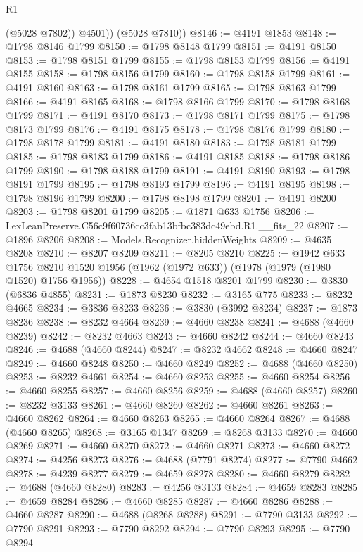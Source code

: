 \begin{lexlean}{R1}
\begin{coremodule}
            (@5028 @7802))
          @4501))
      (@5028 @7810))
@8146 := @4191 @1853
@8148 := @1798 @8146 @1799
@8150 := @1798 @8148 @1799
@8151 := @4191 @8150
@8153 := @1798 @8151 @1799
@8155 := @1798 @8153 @1799
@8156 := @4191 @8155
@8158 := @1798 @8156 @1799
@8160 := @1798 @8158 @1799
@8161 := @4191 @8160
@8163 := @1798 @8161 @1799
@8165 := @1798 @8163 @1799
@8166 := @4191 @8165
@8168 := @1798 @8166 @1799
@8170 := @1798 @8168 @1799
@8171 := @4191 @8170
@8173 := @1798 @8171 @1799
@8175 := @1798 @8173 @1799
@8176 := @4191 @8175
@8178 := @1798 @8176 @1799
@8180 := @1798 @8178 @1799
@8181 := @4191 @8180
@8183 := @1798 @8181 @1799
@8185 := @1798 @8183 @1799
@8186 := @4191 @8185
@8188 := @1798 @8186 @1799
@8190 := @1798 @8188 @1799
@8191 := @4191 @8190
@8193 := @1798 @8191 @1799
@8195 := @1798 @8193 @1799
@8196 := @4191 @8195
@8198 := @1798 @8196 @1799
@8200 := @1798 @8198 @1799
@8201 := @4191 @8200
@8203 := @1798 @8201 @1799
@8205 := @1871 @633 @1756
@8206 := LexLeanPreserve.C56c9f60736cc3fab13bfbc383dc49ebd.R1.__fits_22
@8207 := @1896 @8206
@8208 := Models.Recognizer.hiddenWeights
@8209 := @4635 @8208
@8210 := @8207 @8209
@8211 := @8205 @8210
@8225 := @1942
    @633
    @1756
    @8210
    @1520
    @1956
    (@1962 (@1972 @633))
    (@1978 (@1979 (@1980 @1520) @1756 @1956))
@8228 := @4654 @1518 @8201 @1799
@8230 := @3830 (@6836 @4855)
@8231 := @1873 @8230
@8232 := @3165 @775
@8233 := @8232 @4665
@8234 := @3836 @8233
@8236 := @3830 (@3992 @8234)
@8237 := @1873 @8236
@8238 := @8232 @4664
@8239 := @4660 @8238
@8241 := @4688 (@4660 @8239)
@8242 := @8232 @4663
@8243 := @4660 @8242
@8244 := @4660 @8243
@8246 := @4688 (@4660 @8244)
@8247 := @8232 @4662
@8248 := @4660 @8247
@8249 := @4660 @8248
@8250 := @4660 @8249
@8252 := @4688 (@4660 @8250)
@8253 := @8232 @4661
@8254 := @4660 @8253
@8255 := @4660 @8254
@8256 := @4660 @8255
@8257 := @4660 @8256
@8259 := @4688 (@4660 @8257)
@8260 := @8232 @3133
@8261 := @4660 @8260
@8262 := @4660 @8261
@8263 := @4660 @8262
@8264 := @4660 @8263
@8265 := @4660 @8264
@8267 := @4688 (@4660 @8265)
@8268 := @3165 @1347
@8269 := @8268 @3133
@8270 := @4660 @8269
@8271 := @4660 @8270
@8272 := @4660 @8271
@8273 := @4660 @8272
@8274 := @4256 @8273
@8276 := @4688 (@7791 @8274)
@8277 := @7790 @4662
@8278 := @4239 @8277
@8279 := @4659 @8278
@8280 := @4660 @8279
@8282 := @4688 (@4660 @8280)
@8283 := @4256 @3133
@8284 := @4659 @8283
@8285 := @4659 @8284
@8286 := @4660 @8285
@8287 := @4660 @8286
@8288 := @4660 @8287
@8290 := @4688 (@8268 @8288)
@8291 := @7790 @3133
@8292 := @7790 @8291
@8293 := @7790 @8292
@8294 := @7790 @8293
@8295 := @7790 @8294

\end{coremodule}
\end{lexlean}
